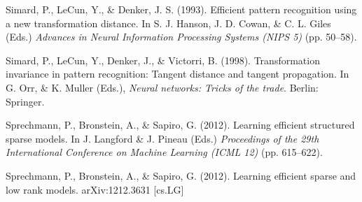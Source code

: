 \documentclass{article} %
\begin{document}
\begin{thebibliography}{100}
Simard, P., LeCun, Y., \& Denker, J. S. (1993). 
\newblock Efficient pattern recognition using a new transformation distance. 
In S. J. Hanson, J. D. Cowan, \& C. L. Giles (Eds.) \emph{Advances in Neural Information Processing Systems (NIPS 5)} (pp. 50--58). %

Simard, P., LeCun, Y., Denker, J., \& Victorri, B. (1998). 
\newblock Transformation invariance in pattern recognition: Tangent distance and tangent propagation. 
\newblock In G. Orr,  \& K. Muller (Eds.), \emph{Neural networks: Tricks of the trade}. Berlin: Springer. 


Sprechmann, P., Bronstein, A., \& Sapiro, G. (2012).
\newblock Learning efficient structured sparse models.
\newblock In J. Langford \& J. Pineau (Eds.) \emph{Proceedings of the 29th International Conference on Machine Learning (ICML 12)} (pp. 615--622).

Sprechmann, P., Bronstein, A., \& Sapiro, G. (2012).
\newblock Learning efficient sparse and low rank models.
\newblock arXiv:1212.3631 [cs.LG]






\end{thebibliography}
\end{document}
